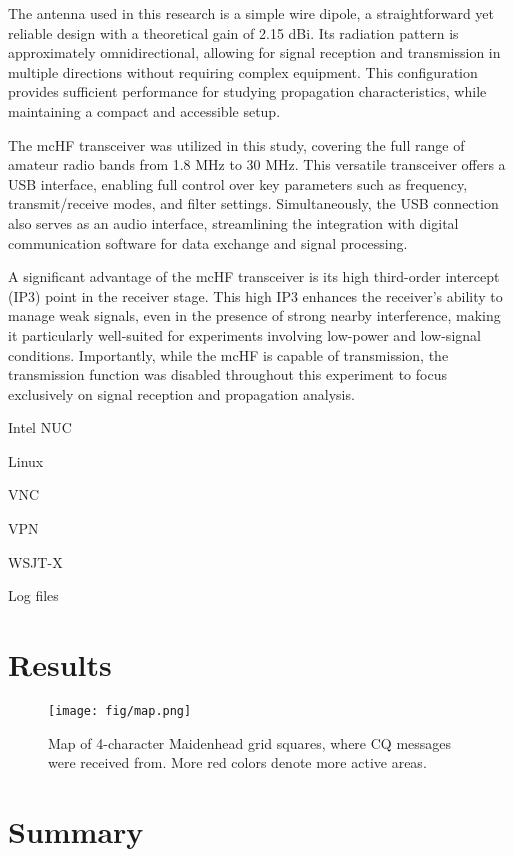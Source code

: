 \documentclass[conference]{IEEEtran}
\begin{document}
The antenna used in this research is a simple wire dipole, a straightforward
yet reliable design with a theoretical gain of 2.15 dBi. Its radiation pattern
is approximately omnidirectional, allowing for signal reception and
transmission in multiple directions without requiring complex equipment. This
configuration provides sufficient performance for studying propagation
characteristics, while maintaining a compact and accessible setup.

The mcHF transceiver was utilized in this study, covering the full range of
amateur radio bands from 1.8 MHz to 30 MHz. This versatile transceiver offers a
USB interface, enabling full control over key parameters such as frequency,
transmit/receive modes, and filter settings. Simultaneously, the USB connection
also serves as an audio interface, streamlining the integration with digital
communication software for data exchange and signal processing.

A significant advantage of the mcHF transceiver is its high third-order
intercept (IP3) point in the receiver stage. This high IP3 enhances the
receiver’s ability to manage weak signals, even in the presence of strong
nearby interference, making it particularly well-suited for experiments
involving low-power and low-signal conditions. Importantly, while the mcHF is
capable of transmission, the transmission function was disabled throughout this
experiment to focus exclusively on signal reception and propagation analysis.



Intel NUC

Linux

VNC

VPN

WSJT-X

Log files


\section{Results}

\begin{figure}[htbp]
	\centering
	\texttt{[image: fig/map.png]}
	\caption{Map of 4-character Maidenhead grid squares, where CQ messages were received from.
  More red colors denote more active areas.}
	\label{fig-dummy}
\end{figure}

\section{Summary}




\end{document}
